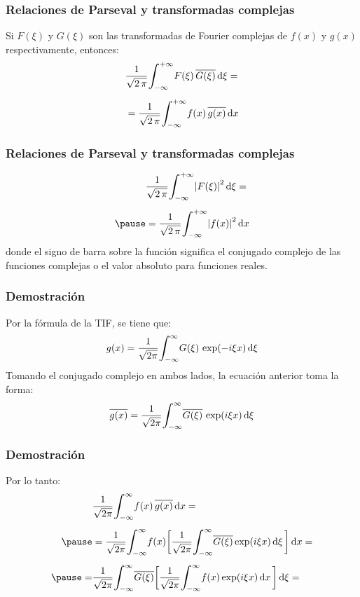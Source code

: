 \begin{frame}
\frametitle{Relaciones de Parseval y transformadas complejas}
Si $F (\xi)$ y $G (\xi)$ son las transformadas de Fourier complejas de $f (x)$ y $g (x)$ respectivamente, entonces:
\pause
\begin{eqnarray}
\begin{aligned}[b]
&\dfrac{1}{\sqrt{2 \, \pi}} \scaleint{6ex}_{\bs -\infty}^{+\infty} F (\xi) \, \overline{G (\xi)} \dd{\xi} = \\[0.5em]
&=\dfrac{1}{\sqrt{2 \, \pi}} \scaleint{6ex}_{\bs -\infty}^{+\infty} f (x) \, \overline{g (x)} \dd{x}
\end{aligned}
\label{eq:ecuacion_01_30}
\end{eqnarray}
\end{frame}
\begin{frame}
\frametitle{Relaciones de Parseval y transformadas complejas}
\begin{eqnarray}
\begin{aligned}[b]
&\dfrac{1}{\sqrt{2 \, \pi}} \scaleint{6ex}_{\bs -\infty}^{+\infty} \abs{F (\xi)}^{2} \dd{\xi} = \\[0.5em] \pause
&= \dfrac{1}{\sqrt{2 \, \pi}} \scaleint{6ex}_{\bs -\infty}^{+\infty} \abs{f (x)}^{2} \dd{x}
\end{aligned}
\label{eq:ecuacion_01_31}
\end{eqnarray}
donde el signo de barra sobre la función significa el conjugado complejo de las funciones complejas o el valor absoluto para funciones reales.
\end{frame}
\begin{frame}
\frametitle{Demostración}
Por la fórmula de la TIF, se tiene que:
\pause
\begin{align*}
g (x) = \dfrac{1}{\sqrt{2 \pi}} \scaleint{6ex}_{\bs -\infty}^{\infty} G (\xi) \, \exp(-i \xi x) \dd{\xi}
\end{align*}
\pause
Tomando el conjugado complejo en ambos lados, la ecuación anterior toma la forma:
\begin{align*}
\overline{g (x)} = \dfrac{1}{\sqrt{2 \pi}} \scaleint{6ex}_{\bs -\infty}^{\infty} \overline{G (\xi)} \, \exp(i \xi x) \dd{\xi}
\end{align*}
\end{frame}
\begin{frame}
\frametitle{Demostración}
Por lo tanto:
\pause
\begin{eqnarray*}
\begin{aligned}
&\dfrac{1}{\sqrt{2 \pi}} \scaleint{6ex}_{\bs -\infty}^{\infty} f (x) \, \overline{g (x)} \dd{x} = \\[0.5em] \pause
&=\dfrac{1}{\sqrt{2 \pi}} \scaleint{6ex}_{\bs -\infty}^{\infty} f (x) \bigg[ \dfrac{1}{\sqrt{2 \pi}} \scaleint{6ex}_{\bs -\infty}^{\infty} \overline{G (\xi)} \exp(i \xi x) \dd{\xi} \bigg] \dd{x} = \\[0.5em] \pause
=& \dfrac{1}{\sqrt{2 \pi}} \scaleint{6ex}_{\bs -\infty}^{\infty} \overline{G (\xi)} \bigg[ \dfrac{1}{\sqrt{2 \pi}} \scaleint{6ex}_{\bs -\infty}^{\infty} f (x) \exp(i \xi x) \dd{x} \bigg] \dd{\xi} = 
\end{aligned}
\end{eqnarray*}
\end{frame}
